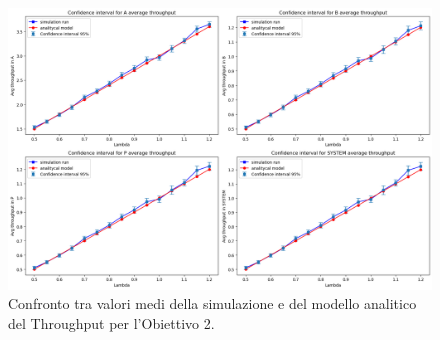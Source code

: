 \begin{figure}
    \centering
    \includegraphics[width=1\linewidth]{figs/results/obj2/verification/obj2_lineplots_throughput.png}
    \caption{Confronto tra valori medi della simulazione e del modello analitico del Throughput per l'Obiettivo 2.}
    \label{fig:obj2_lineplots_throughput}
\end{figure}

